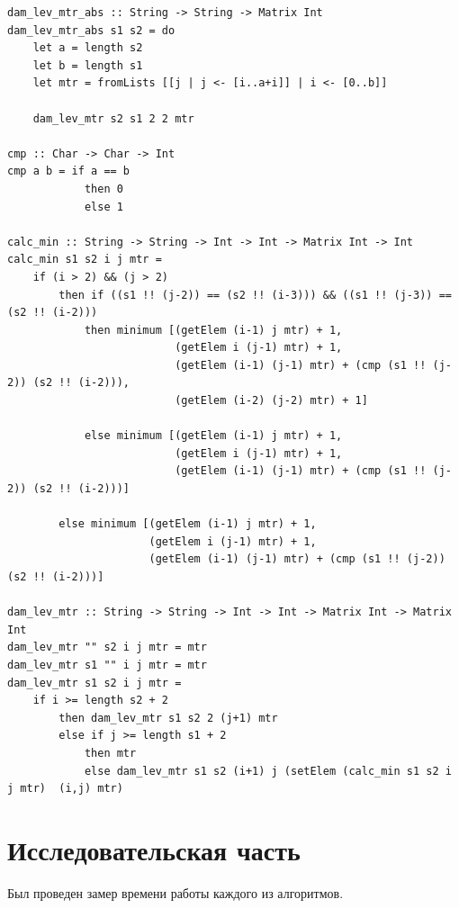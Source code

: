 \documentclass[12pt]{report}
\begin{document}
\begin{lstlisting}[label=some-code,caption=Функция нахождения расстояния Дамерау-Левенштейна матрично]
dam_lev_mtr_abs :: String -> String -> Matrix Int
dam_lev_mtr_abs s1 s2 = do
    let a = length s2
    let b = length s1
    let mtr = fromLists [[j | j <- [i..a+i]] | i <- [0..b]]
    
    dam_lev_mtr s2 s1 2 2 mtr

cmp :: Char -> Char -> Int
cmp a b = if a == b
            then 0
            else 1

calc_min :: String -> String -> Int -> Int -> Matrix Int -> Int
calc_min s1 s2 i j mtr = 
    if (i > 2) && (j > 2)
        then if ((s1 !! (j-2)) == (s2 !! (i-3))) && ((s1 !! (j-3)) == (s2 !! (i-2)))
            then minimum [(getElem (i-1) j mtr) + 1, 
                          (getElem i (j-1) mtr) + 1,
                          (getElem (i-1) (j-1) mtr) + (cmp (s1 !! (j-2)) (s2 !! (i-2))),
                          (getElem (i-2) (j-2) mtr) + 1]
                          
            else minimum [(getElem (i-1) j mtr) + 1, 
                          (getElem i (j-1) mtr) + 1,
                          (getElem (i-1) (j-1) mtr) + (cmp (s1 !! (j-2)) (s2 !! (i-2)))]
                          
        else minimum [(getElem (i-1) j mtr) + 1, 
                      (getElem i (j-1) mtr) + 1,
                      (getElem (i-1) (j-1) mtr) + (cmp (s1 !! (j-2)) (s2 !! (i-2)))]

dam_lev_mtr :: String -> String -> Int -> Int -> Matrix Int -> Matrix Int
dam_lev_mtr "" s2 i j mtr = mtr
dam_lev_mtr s1 "" i j mtr = mtr
dam_lev_mtr s1 s2 i j mtr = 
    if i >= length s2 + 2
        then dam_lev_mtr s1 s2 2 (j+1) mtr
        else if j >= length s1 + 2
            then mtr
            else dam_lev_mtr s1 s2 (i+1) j (setElem (calc_min s1 s2 i j mtr)  (i,j) mtr)
\end{lstlisting}

\chapter{Исследовательская часть}
Был проведен замер времени работы каждого из алгоритмов.
\end{document}
